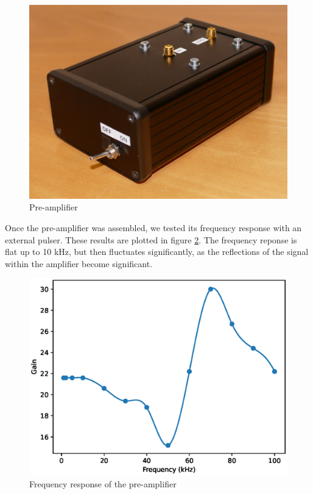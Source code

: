 \documentclass[a4paper]{article}
\begin{document}
\begin{appendices}
\begin{figure}[ht!]
\centering
\includegraphics[width=\textwidth]{fig/P1170874-cropped.jpg}
\caption{Pre-amplifier}
\label{fig:pre_amp}
\end{figure}


\clearpage
Once the pre-amplifier was assembled, we tested its frequency response with an external pulser.
These results are plotted in figure \ref{fig:pre_amp_freq_response}.
The frequency reponse is flat up to 10 kHz, but then fluctuates significantly, as the reflections of the signal within the amplifier become significant.

\begin{figure}[ht!]
\centering
\includegraphics[width=\textwidth]{fig/python/preamp_freq_response}
\caption{Frequency response of the pre-amplifier}
\label{fig:pre_amp_freq_response}
\end{figure}



\end{appendices}
\end{document}
